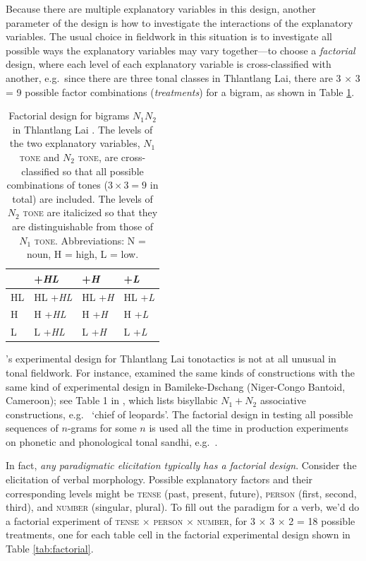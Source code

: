 \documentclass[12pt]{article}
\let\ipa\textipa
\begin{document}
Because there are multiple explanatory variables in this design,
another parameter of the design is how to investigate the
interactions of the explanatory variables. The usual choice in
fieldwork in this situation is to investigate all possible ways the
explanatory variables may vary together---to choose a \textit{factorial} design,
where each level of each explanatory variable is cross-classified with
another, e.g.\ since there are three tonal classes in Thlantlang Lai,
there are 3 $\times$ 3 = 9 possible factor combinations
(\textit{treatments}) for a bigram, as shown in Table \ref{tab:factorial-hyman}.

\begin{table}[!h]
  \centering
  \begin{tabular}{l | l l l}
     & +\textit{HL} & +\textit{H} & +\textit{L} \\\hline
     HL & HL +\textit{HL} & HL +\textit{H} & HL +\textit{L} \\ 
     H & H +\textit{HL} & H +\textit{H} & H +\textit{L} \\ 
     L & L +\textit{HL} & L +\textit{H} & L +\textit{L} \\ 
  \end{tabular}
  \caption{Factorial design for bigrams $N_1 N_2$ in Thlantlang Lai
    \citep[(18)]{Hyman:2007}. The levels of the two explanatory variables, $N_1$
    \textsc{tone} and $N_2$ \textsc{tone}, are cross-classified
    so that all possible combinations of tones ($3 \times 3 = 9$ in
    total) are included. The levels of $N_2$ \textsc{tone} are
    italicized so that they are distinguishable from those of $N_1$
    \textsc{tone}. Abbreviations: N = noun, H = high, L = low.}
  \label{tab:factorial-hyman}
\end{table}

\citet{Hyman:2007}'s experimental design for Thlantlang Lai tonotactics
is not at all unusual in tonal fieldwork. For instance, \citet{Hyman:1985} examined
the same kinds of constructions with the same kind of experimental
design in Bamileke-Dschang (Niger-Congo Bantoid, Cameroon); see Table
1 in \citet{Hyman:1985}, which lists bisyllabic
$N_1+N_2$ associative constructions, e.g.\ \ipa{\`ef\`O m\`@ndzw\`i}
`chief of leopards'. The factorial design in testing all possible
sequences of $n$-grams for some $n$ is used all the time in production
experiments on phonetic and phonological tonal sandhi, e.g.\
\citet{Xu:1997a}. 

In fact, \textit{any paradigmatic elicitation typically has a
factorial design}. Consider the elicitation of verbal morphology. Possible
explanatory factors and their corresponding levels might be
\textsc{tense} (past, present, future), \textsc{person} (first,
second, third), and
\textsc{number} (singular, plural). To fill out the paradigm for a
verb, we'd do a factorial experiment of \textsc{tense} $\times$
\textsc{person} $\times$ \textsc{number}, for 3 $\times$ 3 $\times$ 2
= 18 possible treatments, one for each table cell in the factorial
experimental design shown in Table \ref{tab:factorial}.
\end{document}
